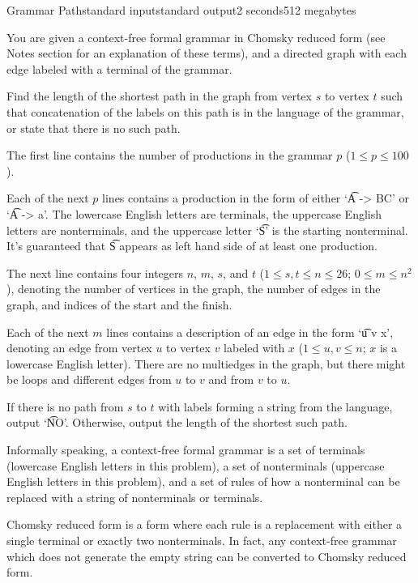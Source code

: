 \begin{problem}{Grammar Path}{standard input}{standard output}{2 seconds}{512 megabytes}

\providecommand{\url}[1]{\underline{\texttt{#1}}}

You are given a context-free formal grammar in Chomsky reduced form (see Notes section for an explanation of these terms), and a directed graph with each edge labeled with a terminal of the grammar.

Find the length of the shortest path in the graph from vertex $s$ to vertex $t$ such that concatenation of the labels on this path is in the language of the grammar, or state that there is no such path.


\InputFile
The first line contains the number of productions in the grammar $p$ ($1 \le p \le 100$).

Each of the next $p$ lines contains a production in the form of either `\t{A -> BC}' or `\t{A -> a}'. The lowercase English letters are terminals, the uppercase English letters are nonterminals, and the uppercase letter `\t{S}' is the starting nonterminal. It's guaranteed that \t{S} appears as left hand side of at least one production. 

The next line contains four integers $n$, $m$, $s$, and $t$ ($1 \le s, t \le n \le 26$; $0 \le m \le n^2$), denoting the number of vertices in the graph, the number of edges in the graph, and indices of the start and the finish.

Each of the next $m$ lines contains a description of an edge in the form `\t{u v x}', denoting an edge from vertex $u$ to vertex $v$ labeled with $x$ ($1 \le u, v \le n$; $x$ is a lowercase English letter). There are no multiedges in the graph, but there might be loops and different edges from $u$ to $v$ and from $v$ to $u$.

\OutputFile
If there is no path from $s$ to $t$ with labels forming a string from the language, output `\t{NO}'. Otherwise, output the length of the shortest such path.

\Note
Informally speaking, a context-free formal grammar is a set of terminals (lowercase English letters in this problem), a set of nonterminals (uppercase English letters in this problem), and a set of rules of how a nonterminal can be replaced with a string of nonterminals or terminals.

Chomsky reduced form is a form where each rule is a replacement with either a single terminal or exactly two nonterminals. In fact, any context-free grammar which does not generate the empty string can be converted to Chomsky reduced form.


\end{problem}
